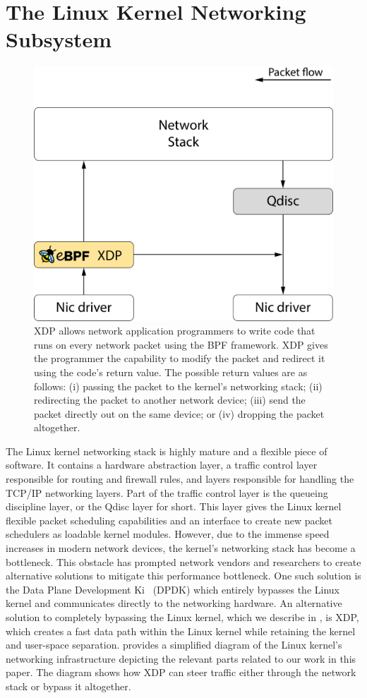 \documentclass[sigconf, nonacm]{acmart}
\begin{document}

\section{The Linux Kernel Networking Subsystem}

\begin{figure}
  \includegraphics[width=0.6\linewidth]{network-overview.pdf}
  \caption{XDP allows network application programmers to write code that runs on every network packet using the BPF framework. XDP gives the programmer the capability to modify the packet and redirect it using the code's return value. The possible return values are as follows: (i) passing the packet to the kernel's networking stack; (ii) redirecting the packet to another network device; (iii) send the packet directly out on the same device; or (iv) dropping the packet altogether.}
  \label{fig:network_overview}
\end{figure}

The Linux kernel networking stack is highly mature and a flexible piece of software. It contains a hardware abstraction layer, a traffic control layer responsible for routing and firewall rules, and layers responsible for handling the TCP/IP networking layers. Part of the traffic control layer is the queueing discipline layer, or the Qdisc layer for short. This layer gives the Linux kernel flexible packet scheduling capabilities and an interface to create new packet schedulers as loadable kernel modules. However, due to the immense speed increases in modern network devices, the kernel's networking stack has become a bottleneck. This obstacle has prompted network vendors and researchers to create alternative solutions to mitigate this performance bottleneck. One such solution is the Data Plane Development Ki~\cite{dpdk} (DPDK) which entirely bypasses the Linux kernel and communicates directly to the networking hardware. An alternative solution to completely bypassing the Linux kernel, which we describe in , is XDP, which creates a fast data path within the Linux kernel while retaining the kernel and user-space separation.  provides a simplified diagram of the Linux kernel's networking infrastructure depicting the relevant parts related to our work in this paper. The diagram shows how XDP can steer traffic either through the network stack or bypass it altogether.
\end{document}
